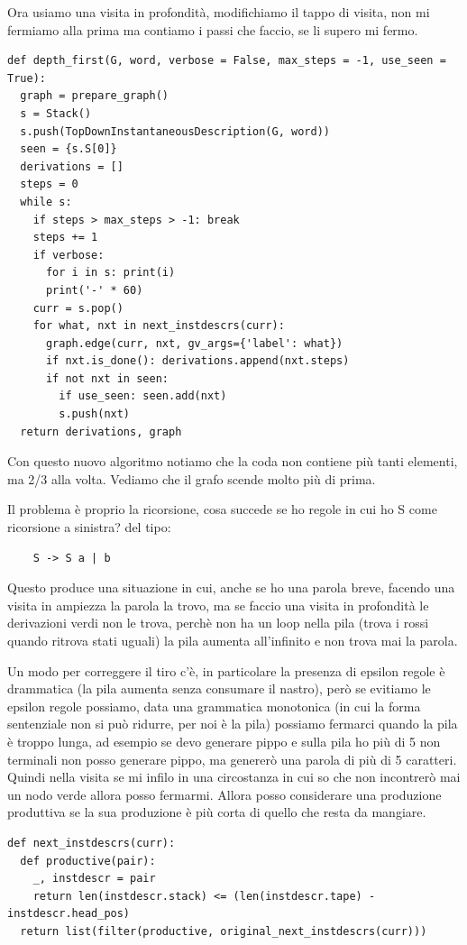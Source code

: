 Ora usiamo una visita in profondità, modifichiamo il tappo di visita, non mi fermiamo alla prima ma contiamo i passi che faccio, se li supero mi fermo.
\begin{lstlisting}
def depth_first(G, word, verbose = False, max_steps = -1, use_seen = True):
  graph = prepare_graph()
  s = Stack()
  s.push(TopDownInstantaneousDescription(G, word))
  seen = {s.S[0]}
  derivations = []
  steps = 0
  while s:
    if steps > max_steps > -1: break
    steps += 1
    if verbose:
      for i in s: print(i)
      print('-' * 60)
    curr = s.pop()
    for what, nxt in next_instdescrs(curr):
      graph.edge(curr, nxt, gv_args={'label': what})
      if nxt.is_done(): derivations.append(nxt.steps)
      if not nxt in seen: 
        if use_seen: seen.add(nxt)
        s.push(nxt)  
  return derivations, graph
\end{lstlisting}

Con questo nuovo algoritmo notiamo che la coda non contiene più tanti elementi, ma 2/3 alla volta. Vediamo che il grafo scende molto più di prima.

Il problema è proprio la ricorsione, cosa succede se ho regole in cui ho S come ricorsione a sinistra? del tipo:
\begin{lstlisting}
    S -> S a | b
\end{lstlisting}

Questo produce una situazione in cui, anche se ho una parola breve, facendo una visita in ampiezza la parola la trovo, ma se faccio una visita in profondità le derivazioni verdi non le trova, perchè non ha un loop nella pila (trova i rossi quando ritrova stati uguali) la pila aumenta all'infinito e non trova mai la parola.

Un modo per correggere il tiro c'è, in particolare la presenza di epsilon regole è drammatica (la pila aumenta senza consumare il nastro), però se evitiamo le epsilon regole possiamo, data una grammatica monotonica (in cui la forma sentenziale non si può ridurre, per noi è la pila) possiamo fermarci quando la pila è troppo lunga, ad esempio se devo generare pippo e sulla pila ho più di 5 non terminali non posso generare pippo, ma genererò una parola di più di 5 caratteri. Quindi nella visita se mi infilo in una circostanza in cui so che non incontrerò mai un nodo verde allora posso fermarmi.
Allora posso considerare una produzione produttiva se la sua produzione è più corta di quello che resta da mangiare.
\begin{lstlisting}
def next_instdescrs(curr):
  def productive(pair):
    _, instdescr = pair
    return len(instdescr.stack) <= (len(instdescr.tape) - instdescr.head_pos)
  return list(filter(productive, original_next_instdescrs(curr)))
\end{lstlisting}

